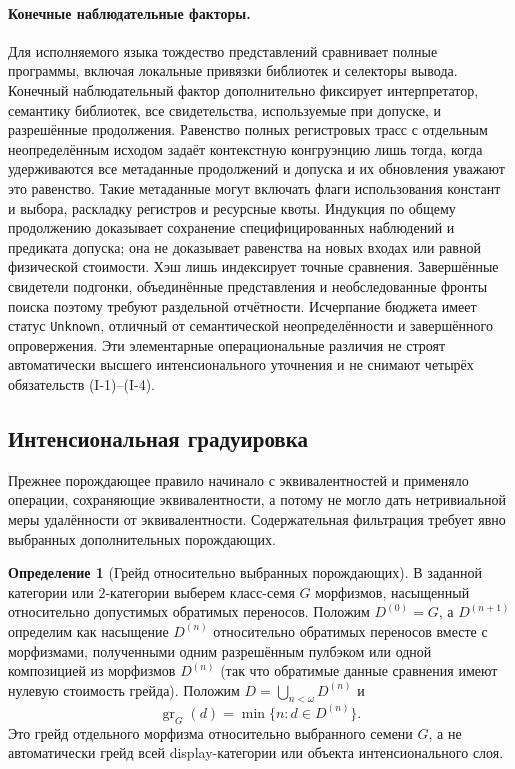 \documentclass[11pt]{article}
\theoremstyle{plain}
\theoremstyle{definition}
\newtheorem{definition}[theorem]{Определение}
\newcommand{\gr}{\operatorname{gr}}
\begin{document}
\paragraph{Конечные наблюдательные факторы.}
Для исполняемого языка тождество представлений сравнивает полные программы,
включая локальные привязки библиотек и селекторы вывода. Конечный наблюдательный
фактор дополнительно фиксирует интерпретатор, семантику библиотек, все свидетельства,
используемые при допуске, и разрешённые продолжения. Равенство полных
регистровых трасс с отдельным неопределённым исходом задаёт контекстную конгруэнцию
лишь тогда, когда удерживаются все метаданные продолжений и допуска и их
обновления уважают это равенство. Такие метаданные могут включать флаги
использования констант и выбора, раскладку регистров и ресурсные квоты.
Индукция по общему продолжению доказывает сохранение специфицированных наблюдений
и предиката допуска; она не доказывает равенства на новых входах или равной
физической стоимости. Хэш лишь индексирует точные сравнения. Завершённые
свидетели подгонки, объединённые представления и необследованные фронты поиска
поэтому требуют раздельной отчётности. Исчерпание бюджета имеет статус \texttt{Unknown},
отличный от семантической неопределённости и завершённого опровержения. Эти
элементарные операциональные различия не строят автоматически высшего
интенсионального уточнения и не снимают четырёх обязательств (I-1)--(I-4).

\subsection{Интенсиональная градуировка}\label{sec:intensional-grading}

Прежнее порождающее правило начинало с эквивалентностей и применяло операции, сохраняющие эквивалентности, а потому не могло дать нетривиальной меры удалённости от эквивалентности. Содержательная фильтрация требует явно выбранных дополнительных порождающих.

\begin{definition}[Грейд относительно выбранных порождающих]\label{def:display-grade}
В заданной категории или $2$-категории выберем класс-семя $G$ морфизмов, насыщенный относительно допустимых обратимых переносов. Положим $D^{(0)} = G$, а $D^{(n+1)}$ определим как насыщение $D^{(n)}$ относительно обратимых переносов вместе с морфизмами, полученными одним разрешённым пулбэком или одной композицией из морфизмов $D^{(n)}$ (так что обратимые данные сравнения имеют нулевую стоимость грейда). Положим $D = \bigcup_{n < \omega} D^{(n)}$ и
\[
 \gr_G(d) = \min\{n : d \in D^{(n)}\}.
\]
Это грейд отдельного морфизма относительно выбранного семени $G$, а не автоматически грейд всей display-категории или объекта интенсионального слоя.
\end{definition}
\end{document}
